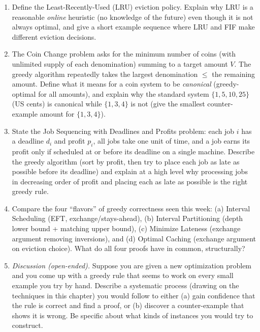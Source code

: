 \documentclass[11pt]{article}
\begin{document}
\begin{enumerate}[label=\textbf{A\arabic*.}, leftmargin=2.2em]
\item Define the Least-Recently-Used (LRU) eviction policy. Explain why LRU is a
reasonable \emph{online} heuristic (no knowledge of the future) even though it is not
always optimal, and give a short example sequence where LRU and FIF make different
eviction decisions.

\item The Coin Change problem asks for the minimum number of coins (with unlimited supply
of each denomination) summing to a target amount $V$. The greedy algorithm repeatedly
takes the largest denomination $\le$ the remaining amount. Define what it means for a
coin system to be \emph{canonical} (greedy-optimal for all amounts), and explain why the
standard system $\{1, 5, 10, 25\}$ (US cents) is canonical while $\{1, 3, 4\}$ is not
(give the smallest counter-example amount for $\{1,3,4\}$).

\item State the Job Sequencing with Deadlines and Profits problem: each job $i$ has a
deadline $d_i$ and profit $p_i$, all jobs take one unit of time, and a job earns its
profit only if scheduled at or before its deadline on a single machine. Describe the
greedy algorithm (sort by profit, then try to place each job as late as possible before
its deadline) and explain at a high level why processing jobs in decreasing order of
profit and placing each as late as possible is the right greedy rule.

\item Compare the four ``flavors'' of greedy correctness seen this week: (a)
Interval Scheduling (EFT, exchange/stays-ahead), (b) Interval Partitioning (depth lower
bound + matching upper bound), (c) Minimize Lateness (exchange argument removing
inversions), and (d) Optimal Caching (exchange argument on eviction choice). What do all
four proofs have in common, structurally?

\item \emph{Discussion (open-ended).} Suppose you are given a new optimization problem
and you come up with a greedy rule that seems to work on every small example you try by
hand. Describe a systematic process (drawing on the techniques in this chapter) you would
follow to either (a) gain confidence that the rule is correct and find a proof, or (b)
discover a counter-example that shows it is wrong. Be specific about what kinds of
instances you would try to construct.

\end{enumerate}
\end{document}
